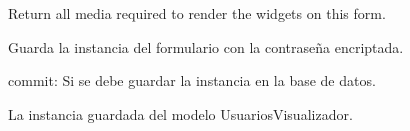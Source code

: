 \documentclass[letterpaper,10pt,spanish]{sphinxmanual}
\begin{document}
\begin{fulllineitems}
\begin{fulllineitems}

\pysigstartsignatures
{}
\pysigstopsignatures
\sphinxAtStartPar
Return all media required to render the widgets on this form.

\end{fulllineitems}



\begin{fulllineitems}

\pysigstartsignatures
{}
\pysigstopsignatures
\sphinxAtStartPar
Guarda la instancia del formulario con la contraseña encriptada.
\begin{description}
\sphinxAtStartPar
commit: Si se debe guardar la instancia en la base de datos.

\sphinxAtStartPar
La instancia guardada del modelo UsuariosVisualizador.

\end{description}

\end{fulllineitems}


\end{fulllineitems}
\end{document}
